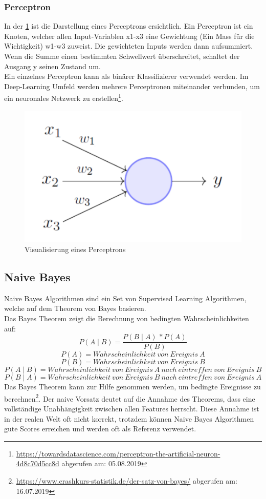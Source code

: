 \subsubsection{Perceptron}
In der \cref{fig:perceptron-grafik} ist die Darstellung eines Perceptrons ersichtlich.
Ein Perceptron ist ein Knoten, welcher allen Input-Variablen \glqq x1-x3\grqq{} eine Gewichtung (Ein Mass für die Wichtigkeit) \glqq w1-w3\grqq{} zuweist.
Die gewichteten Inputs werden dann aufsummiert.
Wenn die Summe einen bestimmten Schwellwert überschreitet, schaltet der Ausgang \glqq y\grqq{} seinen Zustand um.\\
Ein einzelnes Perceptron kann als binärer Klassifizierer verwendet werden.
Im Deep-Learning Umfeld werden mehrere Perceptronen miteinander verbunden, um ein neuronales Netzwerk zu erstellen\footnote{\url{https://towardsdatascience.com/perceptron-the-artificial-neuron-4d8c70d5cc8d} abgerufen am: 05.08.2019}.
\begin{figure}[H]
	\centering	
	\includegraphics[width=0.6\columnwidth,keepaspectratio]{img/perceptron.png}
	\caption{Visualisierung eines Perceptrons}
	\label{fig:perceptron-grafik}
\end{figure}
\subsection{Naive Bayes}
Naive Bayes Algorithmen sind ein Set von Supervised Learning Algorithmen, welche auf dem Theorem von Bayes basieren.\\
Das Bayes Theorem zeigt die Berechnung von bedingten Wahrscheinlichkeiten auf:
$$ P(A \mid B) = \frac{P(B \mid A) \,* P(A)}{P(B)} $$
$$ P(A) = Wahrscheinlichkeit\ von\ Ereignis\ A$$
$$ P(B) = Wahrscheinlichkeit\ von\ Ereignis\ B$$
$$ P(A \mid B) = Wahrscheinlichkeit\ von\ Ereignis\ A\ nach\ eintreffen\ von\ Ereignis\ B$$
$$ P(B \mid A) = Wahrscheinlichkeit\ von\ Ereignis\ B\ nach\ eintreffen\ von\ Ereignis\ A$$
Das Bayes Theorem kann zur Hilfe genommen werden, um bedingte Ereignisse zu berechnen\footnote{\url{https://www.crashkurs-statistik.de/der-satz-von-bayes/} abgerufen am: 16.07.2019}.
Der naive Vorsatz deutet auf die Annahme des Theorems, dass eine vollständige Unabhängigkeit zwischen allen Features herrscht.
Diese Annahme ist in der realen Welt oft nicht korrekt, trotzdem können Naive Bayes Algorithmen gute Scores erreichen und werden oft als Referenz verwendet. \cite{rennie2003tackling}
